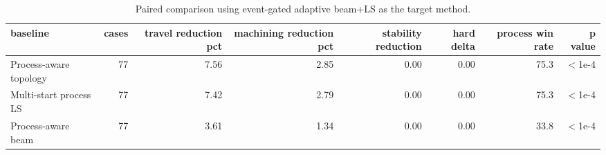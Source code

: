 \begin{table}[t]
\centering
\caption{Paired comparison using event-gated adaptive beam+LS as the target method.}
\label{tab:main-paired-comparison}
\begin{tabular}{lrrrrrrr}
\toprule
baseline & cases & travel reduction pct & machining reduction pct & stability reduction & hard delta & process win rate & p value \\
\midrule
Process-aware topology & 77 & 7.56 & 2.85 & 0.00 & 0.00 & 75.3 & $<$1e-4 \\
Multi-start process LS & 77 & 7.42 & 2.79 & 0.00 & 0.00 & 75.3 & $<$1e-4 \\
Process-aware beam & 77 & 3.61 & 1.34 & 0.00 & 0.00 & 33.8 & $<$1e-4 \\
\bottomrule
\end{tabular}
\end{table}
